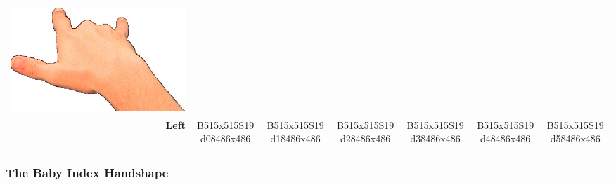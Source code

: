 \documentclass{article}
\begin{document}
\begin{center}
\begin{tabular}{r*{6}{c}}
\includegraphics[scale=0.1]{images/06-10-6.jpg}\\
\textbf{Left}&
B515x515S19d08486x486&
B515x515S19d18486x486&
B515x515S19d28486x486&
B515x515S19d38486x486&
B515x515S19d48486x486&
B515x515S19d58486x486\\
\end{tabular}
\end{center}

\subsubsection{The Baby Index Handshape}
\end{document}
